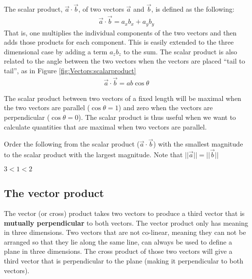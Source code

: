 The scalar product, $\vec a \cdot \vec b$, of two vectors $\vec a$ and $\vec b$, is defined as the following:
\begin{align*}
\vec a \cdot \vec b=a_xb_x +a_yb_y
\end{align*}
That is, one multiplies the individual components of the two vectors and then adds those products for each component. This is easily extended to the three dimensional case by adding a term $a_zb_z$ to the sum. The scalar product is also related to the angle between the two vectors when the vectors are placed ``tail to tail'', as in Figure \ref{fig:Vectors:scalarproduct}
\begin{align*}
\vec a \cdot \vec b= ab\cos\theta
\end{align*}


The scalar product between two vectors of a fixed length will be maximal when the two vectors are parallel ($\cos\theta=1$) and zero when the vectors are perpendicular ($\cos\theta =0$). The scalar product is thus useful when we want to calculate quantities that are maximal when two vectors are parallel. 

\begin{checkpoint}
Order the following from the scalar product ($\vec a \cdot \vec b$) with the smallest magnitude to the scalar product with the largest magnitude. Note that $||\vec a||=||\vec b||$

\begin{answer}
$3<1<2$
\end{answer}
\end{checkpoint}


\subsection{The vector product}
The vector (or cross) product takes two vectors to produce a third vector that is \textbf{mutually perpendicular} to both vectors. The vector product only has meaning in three dimensions. Two vectors that are not co-linear, meaning they can not be arranged so that they lie along the same line, can always be used to define a plane in three dimensions. The cross product of those two vectors will give a third vector that is perpendicular to the plane (making it perpendicular to both vectors). 

